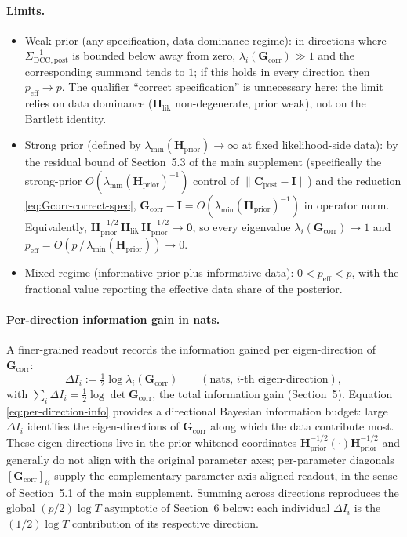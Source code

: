 \documentclass[11pt]{article}
\begin{document}
\paragraph{Limits.}
\begin{itemize}
\item Weak prior (any specification, data-dominance regime): in directions where $\Sigma_{\mathrm{DCC},\mathrm{post}}^{-1}$ is bounded below away from zero, $\lambda_i(\mathbf G_{\mathrm{corr}}) \gg 1$ and the corresponding summand tends to $1$; if this holds in every direction then $p_{\mathrm{eff}} \to p$. The qualifier ``correct specification'' is unnecessary here: the limit relies on data dominance ($\mathbf H_{\mathrm{lik}}$ non-degenerate, prior weak), not on the Bartlett identity.
\item Strong prior (defined by $\lambda_{\min}(\mathbf H_{\mathrm{prior}}) \to \infty$ at fixed likelihood-side data): by the residual bound of Section~5.3 of the main supplement (specifically the strong-prior $O(\lambda_{\min}(\mathbf H_{\mathrm{prior}})^{-1})$ control of $\|\mathbf C_{\mathrm{post}} - \mathbf I\|$) and the reduction \eqref{eq:Gcorr-correct-spec}, $\mathbf G_{\mathrm{corr}} - \mathbf I = O(\lambda_{\min}(\mathbf H_{\mathrm{prior}})^{-1})$ in operator norm. Equivalently, $\mathbf H_{\mathrm{prior}}^{-1/2}\, \mathbf H_{\mathrm{lik}}\, \mathbf H_{\mathrm{prior}}^{-1/2} \to \mathbf 0$, so every eigenvalue $\lambda_i(\mathbf G_{\mathrm{corr}}) \to 1$ and $p_{\mathrm{eff}} = O(p\, /\, \lambda_{\min}(\mathbf H_{\mathrm{prior}})) \to 0$.
\item Mixed regime (informative prior plus informative data): $0 < p_{\mathrm{eff}} < p$, with the fractional value reporting the effective data share of the posterior.
\end{itemize}

\paragraph{Per-direction information gain in nats.}
A finer-grained readout records the information gained per eigen-direction of $\mathbf G_{\mathrm{corr}}$:
\begin{equation}
\Delta I_i := \tfrac{1}{2} \log \lambda_i(\mathbf G_{\mathrm{corr}})
\qquad
(\text{nats, } i\text{-th eigen-direction}),
\label{eq:per-direction-info}
\end{equation}
with $\sum_i \Delta I_i = \tfrac{1}{2} \log \det \mathbf G_{\mathrm{corr}}$, the total information gain (Section~5). Equation \eqref{eq:per-direction-info} provides a directional Bayesian information budget: large $\Delta I_i$ identifies the eigen-directions of $\mathbf G_{\mathrm{corr}}$ along which the data contribute most. These eigen-directions live in the prior-whitened coordinates $\mathbf H_{\mathrm{prior}}^{-1/2}(\cdot)\mathbf H_{\mathrm{prior}}^{-1/2}$ and generally do not align with the original parameter axes; per-parameter diagonals $[\mathbf G_{\mathrm{corr}}]_{ii}$ supply the complementary parameter-axis-aligned readout, in the sense of Section~5.1 of the main supplement. Summing across directions reproduces the global $(p/2)\log T$ asymptotic of Section~6 below: each individual $\Delta I_i$ is the $(1/2)\log T$ contribution of its respective direction.
\end{document}
